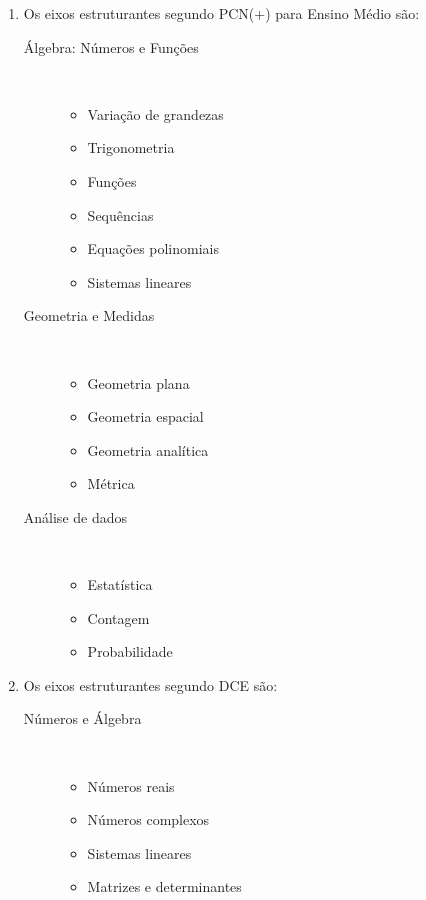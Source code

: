 \documentclass[a4paper, 12pt]{article}
\begin{document}
\begin{enumerate}
\item Os eixos estruturantes segundo PCN(+) para Ensino Médio são:\\
  \begin{description}
  \item[Álgebra: Números e Funções]\ \\   
    \begin{itemize} 
    \item Variação de grandezas
    \item Trigonometria
    \item Funções
    \item Sequências
    \item Equações polinomiais
    \item Sistemas lineares \\
    \end{itemize}
  \item[Geometria e Medidas]\ \\
    \begin{itemize}
    \item Geometria plana
    \item Geometria espacial
    \item Geometria analítica
    \item Métrica \\
    \end{itemize}    
  \item[Análise de dados]\ \\
    \begin{itemize}
    \item Estatística
    \item Contagem
    \item Probabilidade \\
    \end{itemize}        
  \end{description} 
\item Os eixos estruturantes segundo DCE são:
  \begin{description}
  \item[Números e Álgebra]\ \\
    \begin{itemize}
    \item Números reais
    \item Números complexos
    \item Sistemas lineares
    \item Matrizes e determinantes

\end{itemize}
\end{description}
\end{enumerate}
\end{document}
